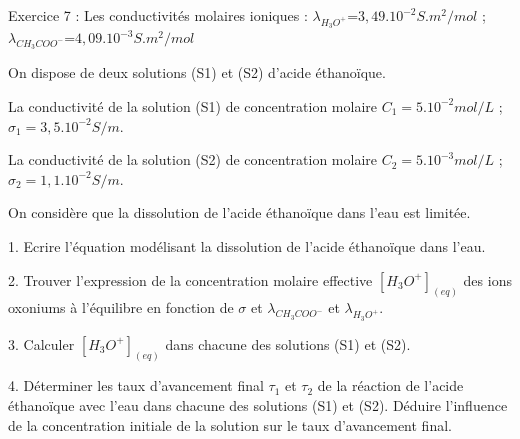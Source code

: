 \documentclass[12pt, french]{article}
\begin{document}
\begin{Box2}{Exercice 7 : }
	Les conductivités molaires ioniques : $\lambda_{H_3O^+}$=$3,49.10^{-2}S.m^2/mol$ ; $\lambda_{CH_3COO^-}$=$4,09.10^{-3}S.m^2/mol$

	On dispose de deux solutions (S1) et (S2) d’acide éthanoïque.

	La conductivité de la solution (S1) de concentration molaire $C_1=5.10^{-2}mol/L$ ; $\sigma_1= 3,5.10^{-2}S/m$.

	La conductivité de la solution (S2) de concentration molaire $C_2=5.10^{-3}mol/L$ ; $\sigma_2=1,1.10^{-2}S/m$.

	On considère que la dissolution de l’acide éthanoïque dans l’eau est limitée.

1. Ecrire l’équation modélisant la dissolution de l’acide éthanoïque dans l’eau.

2. Trouver l’expression de la concentration molaire effective $[H_3O^+]_{(eq)}$ des ions oxoniums à l’équilibre en
fonction de $\sigma$ et $\lambda_{CH_3COO^-}$ et $\lambda_{H_3O^+}$.

3. Calculer $[H_3O^+]_{(eq)}$ dans chacune des solutions (S1) et (S2).

4. Déterminer les taux d’avancement final $\tau_1$ et $\tau_2$ de la réaction de l’acide éthanoïque avec l’eau dans chacune
des solutions (S1) et (S2). Déduire l’influence de la concentration initiale de la solution sur le taux
d’avancement final.

\end{Box2}
\end{document}
